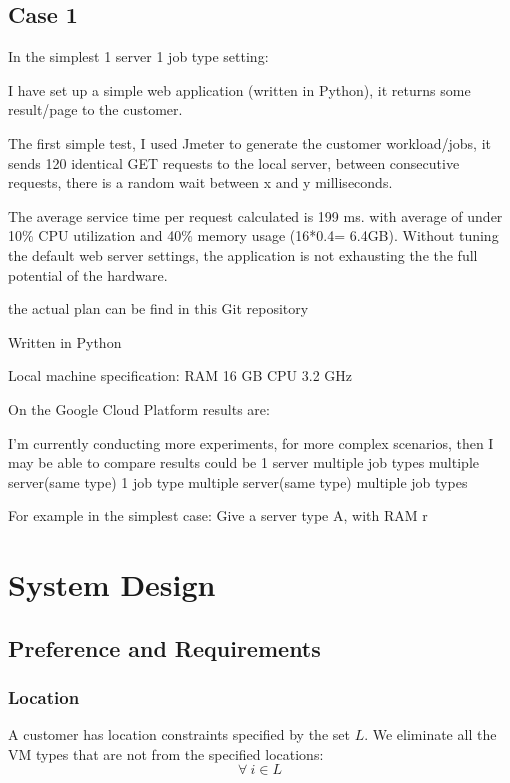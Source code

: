 \subsection{Case 1}
In the simplest 1 server 1 job type setting:

I have set up a simple web application (written in Python), it returns some result/page to the customer.

The first simple test, I used Jmeter to generate the customer workload/jobs, it sends 120 identical GET requests to the local server, between consecutive requests, there is a random wait between x and y milliseconds.

The average service time per request calculated is 199 ms. 
with average of under 10\% CPU utilization and 40\% memory usage (16*0.4= 6.4GB).
Without tuning the default web server settings, the application is not exhausting the the full potential of the hardware. 


the actual plan can be find in this Git repository

Written in Python

Local machine specification:
RAM 16 GB 
CPU 3.2 GHz



On the Google Cloud Platform results are:

I'm currently conducting more experiments, for more complex scenarios, then I may be able to compare results 
could be 
1 server multiple job types
multiple server(same type) 1 job type
multiple server(same type) multiple job types

For example in the simplest case:
Give a server type A, with RAM r

\section{System Design}
\label{sec:sys_design}



\subsection{Preference and Requirements}


\subsubsection{Location}

A customer has location constraints specified by the set $L$. We eliminate all the VM types that are not from the specified locations:
\begin{equation} \label{eq:location_constraint}
\forall\ i \in L
\end{equation}

